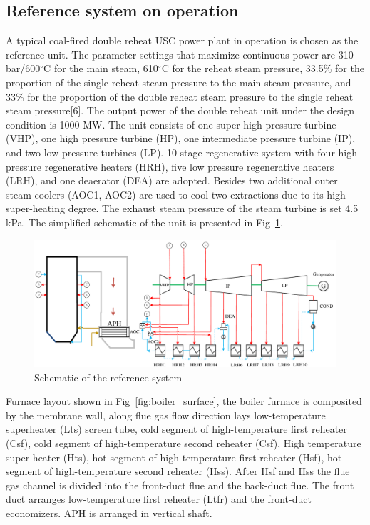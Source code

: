 \documentclass[preprint,12pt]{elsarticle}
\begin{document}
\subsection{Reference system on operation} %
\label{sub2:ref intro}
A typical coal-fired double reheat USC power plant in operation is chosen as the reference unit.
The parameter settings that maximize continuous power are 310\,bar/600$^\circ$C for the main steam, 610$^\circ$C for the reheat steam pressure, 33.5\% for the proportion of the single reheat steam pressure to the main steam pressure, and 33\% for the proportion of the double reheat steam pressure to the single reheat steam pressure[6].
The output power of the double reheat unit under the design condition is 1000 MW.
The unit consists of one super high pressure turbine (VHP), one high pressure turbine (HP), one intermediate pressure turbine (IP), and two low pressure turbines (LP).
10-stage regenerative system with four high pressure regenerative heaters (HRH), five low pressure regenerative heaters (LRH), and one deaerator (DEA) are adopted.
Besides two additional outer steam coolers (AOC1, AOC2) are used to cool two extractions due to its high super-heating degree. The exhaust steam pressure of the steam turbine is set 4.5\,kPa. The simplified schematic of the unit is presented in Fig~\ref{fig:reference_system}.

\begin{figure}[htbp]
\centering
\includegraphics[width=1\textwidth]{fig/reference_system}
\caption{Schematic of the reference system} 
\label{fig:reference_system}
\end{figure}
Furnace layout shown in Fig~\ref{fig:boiler_surface}, the boiler furnace is composited by the membrane wall, along flue gas flow direction lays low-temperature superheater (Lts) screen tube, cold segment of high-temperature first reheater (Csf), cold segment of high-temperature second reheater (Csf), High temperature super-heater (Hts), hot segment of high-temperature first reheater (Hsf), hot segment of high-temperature second reheater (Hss).
After Hsf and Hss the flue gas channel is divided into the front-duct flue and the back-duct flue. The front duct arranges low-temperature first reheater (Ltfr) and the front-duct economizers.
APH is arranged in vertical shaft.
\end{document}
